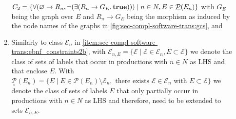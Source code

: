 \begin{definition}
\begin{enumerate}
\begin{enumerate}
  	$C_2=\{\forall(\varnothing \to R_n,\neg(\exists(R_n \to G_E,\textbf{true}))) \mid n \in N, E \in \underline{\mathcal{P}}(E_n)\}$ with $G_E$ being the graph over $E$ and $R_n \to G_E$ being the morphism as induced by the node names of the graphs in \cref{fig:sec-compl-software-trans:gcs}, and
  	\item Similarly to class $\mathcal{E}_n$ in \cref{item:sec-compl-software-trans:ebnf_constraints2b}, with $\mathcal{E}_{n,E}=\{\mathcal{E} \mid \mathcal{E} \in \mathcal{E}_n,E \subset \mathcal{E}\}$ we denote the class of sets of labels that occur in productions with $n \in N$ as LHS and that enclose $E$.
  	With $\underline{\underline{\mathcal{P}}}(E_n)=\{E \mid E \in \mathcal{P}(E_n) \setminus \mathcal{E}_n,\text{ there exists } \mathcal{E} \in \mathcal{E}_n \text{ with } E \subset \mathcal{E}\}$ we denote the class of sets of labels $E$ that only partially occur in productions with $n \in N$ as LHS and therefore, need to be extended to sets $\mathcal{E}_{n,E}$.
  	

\end{enumerate}
\end{enumerate}
\end{definition}
